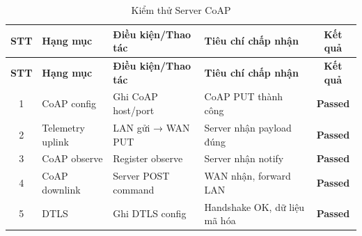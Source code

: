         \begin{longtable}{|c|p{}|p{}|p{}|c|}
            \caption{Kiểm thử Server CoAP}
            \label{tab:test_coap} \\
            \hline
            \textbf{STT} & \textbf{Hạng mục} & \textbf{Điều kiện/Thao tác} & \textbf{Tiêu chí chấp nhận} & \textbf{Kết quả} \\ \hline
            \endfirsthead
        
            \hline
            \textbf{STT} & \textbf{Hạng mục} & \textbf{Điều kiện/Thao tác} & \textbf{Tiêu chí chấp nhận} & \textbf{Kết quả} \\ \hline
            \endhead
        
            \hline
            \endfoot
            \endlastfoot
        
            1 & CoAP config & Ghi CoAP host/port & CoAP PUT thành công & \textcolor{modern_blue}{\textbf{Passed}} \\ \hline
            2 & Telemetry uplink & LAN gửi → WAN PUT & Server nhận payload đúng & \textcolor{modern_blue}{\textbf{Passed}} \\ \hline
            3 & CoAP observe & Register observe & Server nhận notify & \textcolor{modern_blue}{\textbf{Passed}} \\ \hline
            4 & CoAP downlink & Server POST command & WAN nhận, forward LAN & \textcolor{modern_blue}{\textbf{Passed}} \\ \hline
            5 & DTLS & Ghi DTLS config & Handshake OK, dữ liệu mã hóa & \textcolor{modern_blue}{\textbf{Passed}} \\ \hline
        \end{longtable}

